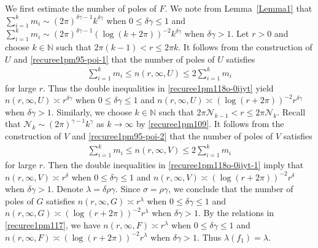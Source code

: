 \documentclass[12pt]{amsart}
\numberwithin{equation}{section}
\begin{document}
We first estimate the number of poles of $F$. We note from Lemma~\ref{Lemma1} that $\sum_{i=1}^{k}m_i\sim (2\pi)^{\delta\gamma-1}k^{\delta\gamma}$ when $0\leq \delta\gamma\leq 1$ and  $\sum_{i=1}^{k}m_i\sim (2\pi)^{\delta\gamma-1}(\log(k+2\pi))^{-2}k^{\delta\gamma}$ when $\delta\gamma>1$. Let $r>0$ and choose $k\in \mathbb{N}$ such that $2\pi(k-1)<r\leq 2\pi k$. It follows from the construction of $U$ and \eqref{recuree1pm95-poi-1} that the number of poles of $U$ satisfies
\begin{equation}\label{recuree1pm118o-0ijyt}
\begin{split}
\sum_{i=1}^{k}m_i \leq n(r,\infty,U)\leq 2\sum_{i=1}^{k}m_i
\end{split}
\end{equation}
for large $r$. Thus the double inequalities in \eqref{recuree1pm118o-0ijyt} yield $n(r,\infty,U)\asymp r^{\delta\gamma}$ when $0\leq \delta\gamma\leq 1$ and $n(r,\infty,U)\asymp (\log(r+2\pi))^{-2}r^{\delta\gamma}$ when $\delta\gamma>1$. Similarly, we choose $k\in \mathbb{N}$ such that $2\pi\mathcal{N}_{k-1} <r \leq 2\pi \mathcal{N}_k$. Recall that $\mathcal{N}_k\sim (2\pi)^{\gamma-1}k^{\gamma}$ as $k\to\infty$ by \eqref{recuree1pm109}. It follows from the construction of $V$ and \eqref{recuree1pm95-poi-2} that the number of poles of $V$ satisfies
\begin{equation}\label{recuree1pm118o-0ijyt-1}
\begin{split}
\sum_{i=1}^{k}m_i \leq n(r,\infty,V)\leq 2\sum_{i=1}^{k}m_i
\end{split}
\end{equation}
for large $r$. Then the double inequalities in \eqref{recuree1pm118o-0ijyt-1} imply that $n(r,\infty,V)\asymp r^{\delta}$ when $0\leq \delta\gamma\leq 1$ and $n(r,\infty,V)\asymp (\log(r+2\pi))^{-2}r^{\delta}$ when $\delta\gamma>1$. Denote $\lambda=\delta\rho\gamma$. Since $\sigma=\rho\gamma$, we conclude that the number of poles of $G$ satisfies $n(r,\infty,G)\asymp r^{\lambda}$ when $0\leq \delta\gamma\leq 1$ and $n(r,\infty,G)\asymp (\log(r+2\pi))^{-2}r^{\lambda}$ when $\delta\gamma>1$. By the relations in \eqref{recuree1pm117}, we have $n(r,\infty,F)\asymp r^{\lambda}$ when $0\leq \delta\gamma\leq 1$ and $n(r,\infty,F)\asymp (\log(r+2\pi))^{-2}r^{\lambda}$ when $\delta\gamma>1$. Thus $\lambda(f_1)=\lambda$.
\end{document}
